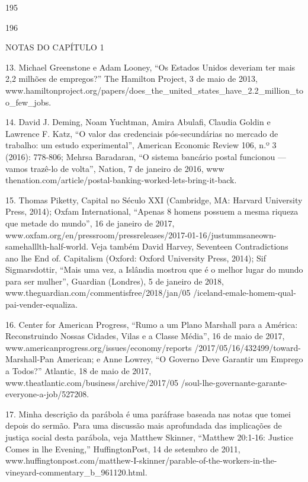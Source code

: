  \par 
195
 \par 
196
 \par 
NOTAS DO CAPÍTULO {\color{blue}1}
 \par 
13. Michael Greenstone e Adam Looney, “Os Estados Unidos deveriam ter mais 2,2 milhões de empregos?” The Hamilton Project, {\color{blue}3} de maio de 2013, www.hamiltonproject.org/papers/does_the_united_states_have_2.2_million_too_few_jobs.
 \par 
14. David J. Deming, Noam Yuchtman, Amira Abulafi, Claudia Goldin e Lawrence F. Katz, “O valor das credenciais pós-secundárias no mercado de trabalho: um estudo experimental”, American Economic Review 106, n.º {\color{blue}3} (2016): 778-806; Mehrsa Baradaran, “O sistema bancário postal funcionou — vamos trazê-lo de volta”, Nation, {\color{blue}7} de janeiro de 2016, www thenation.com/article/postal-banking-worked-lets-bring-it-back.
 \par 
15. Thomas Piketty, Capital no Século XXI (Cambridge, MA: Harvard University Press, 2014); Oxfam International, “Apenas {\color{blue}8} homens possuem a mesma riqueza que metade do mundo”, {\color{blue}16} de janeiro de 2017, www.oxfam.org/en/pressroom/pressreleases/2017-01-16/justummsaneown-samehalllth-half-world. Veja também David Harvey, Seventeen Contradictions ano lhe End of. Capitalism (Oxford: Oxford University Press, 2014); Sif Sigmarsdottir, “Mais uma vez, a Islândia mostrou que é o melhor lugar do mundo para ser mulher”, Guardian (Londres), {\color{blue}5} de janeiro de 2018, www.theguardian.com/commentisfree/2018/jan/05 /iceland-emale-homem-qual-pai-vender-equaliza.
 \par 
16. Center for American Progress, “Rumo a um Plano Marshall para a América: Reconstruindo Nossas Cidades, Vilas e a Classe Média”, {\color{blue}16} de maio de 2017, www.americanprogress.org/issues/economy/reports /2017/05/16/432499/toward-Marshall-Pan American; e Anne Lowrey, “O Governo Deve Garantir um Emprego a Todos?” Atlantic, {\color{blue}18} de maio de 2017, www.theatlantic.com/business/archive/2017/05 /soul-lhe-governante-garante-everyone-a-job/527208.
 \par 
17. Minha descrição da parábola é uma paráfrase baseada nas notas que tomei depois do sermão. Para uma discussão mais aprofundada das implicações de justiça social desta parábola, veja Matthew Skinner, “Matthew 20:1-16: Justice Comes in lhe Evening,” HuffingtonPost, {\color{blue}14} de setembro de 2011, www.huffingtonpost.com/matthew-I-skinner/parable-of-the-workers-in-the-vineyard-commentary_b_961120.html.
